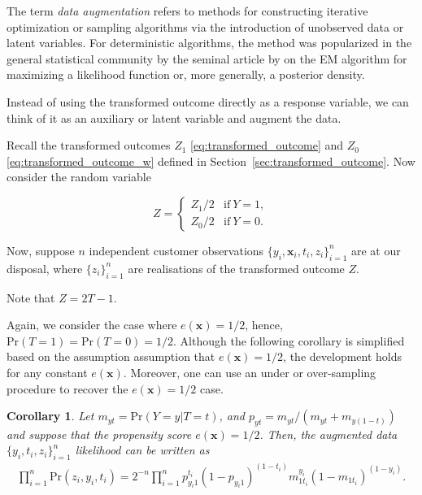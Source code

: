 \documentclass{article}
\def\x{\mathbf x}
\newtheorem{corollary}[theorem]{Corollary}
\begin{document}
The term {\it data augmentation} refers to methods for constructing iterative optimization or sampling algorithms via the introduction of unobserved data or latent variables. For deterministic algorithms, the method was popularized in the general statistical community by the seminal article by \cite{dempster1977maximum} on the EM algorithm for maximizing a likelihood function or, more generally, a posterior density.


Instead of using the transformed outcome directly as a response variable, we can think of it as an auxiliary or latent variable and augment the data.


Recall the transformed outcomes $Z_1$ \eqref{eq:transformed_outcome} and $Z_0$ \eqref{eq:transformed_outcome_w} defined in Section~\ref{sec:transformed_outcome}. Now consider the random variable


\[ Z = \left\{ \begin{array}{cc} 
    Z_1/2 & \mathrm{if}~ Y=1, \\ 
    Z_0/2 & \mathrm{if}~ Y=0. 
    \end{array} \right.
\]


Now, suppose $n$ independent customer observations $\{y_i, \textbf{x}_i, t_i, z_i\}_{i=1}^n$ are at our disposal, where $\{z_i\}_{i=1}^n$ are realisations of the transformed outcome $Z$.



Note that $Z= 2T -1 $. 


Again, we consider the case where $e(\x)=1/2$, hence, $\mathrm{Pr}(T=1)=\mathrm{Pr}(T=0)=1/2$. Although the following corollary is simplified based on the assumption assumption that $e(\x) = 1/2$, the development holds for any constant $e(\x)$. Moreover, one can use an under or over-sampling procedure to recover the $e(\x) = 1/2$ case. 


\begin{corollary}
Let $m_{yt} = \mathrm{Pr}( Y=y | T=t)$, and $p_{yt} = m_{yt} / ( m_{yt} + m_{y(1-t)})$ and suppose that the propensity score $e(\x)=1/2$. Then, the augmented data $\{y_i, t_i, z_i\}_{i=1}^n$ likelihood can be written as
\begin{align}
    \prod_{i=1}^n  \mathrm{Pr}( z_i, y_i, t_i)  = 2^{-n}\prod_{i=1}^n p_{y_i 1}^{t_i } (1 - p_{y_i 1})^{(1-t_i)} m_{1t_i}^{y_i} (1 - m_{1t_i})^{(1-y_i)}.
    \label{eq:adata_lik}
\end{align}
\end{corollary}
\end{document}
